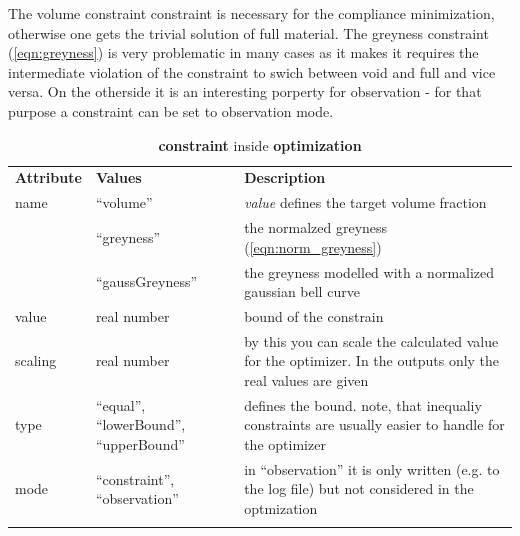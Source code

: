 The volume constraint constraint is necessary for the compliance minimization, otherwise
one gets the trivial solution of full material. The greyness constraint (\ref{eqn:greyness}) is very problematic in many cases as it makes it requires the intermediate violation of the constraint to swich between void and full and vice versa.
On the otherside it is an interesting porperty for observation - for that purpose
a constraint can be set to observation mode.   

\begin{center}
\begin{longtable}{lp{}p{}}
\hline\noalign{\smallskip}
\textbf{Attribute} & \textbf{Values} & \textbf{Description} \\
\noalign{\smallskip}\hline\noalign{\smallskip}
name     & ``volume''  & \textsl{value} defines the target volume fraction \\
         & ``greyness'' & the normalzed greyness (\ref{eqn:norm_greyness}) \\
         & ``gaussGreyness'' & the greyness modelled with a normalized gaussian bell curve \\
value    & real number & bound of the constrain \\
scaling  & real number & by this you can scale the calculated value for the optimizer. In
the outputs only the real values are given \\         
type     & ``equal'', ``lowerBound'', ``upperBound'' & defines the bound. note, that inequaliy constraints are usually easier to handle for the optimizer \\
mode & ``constraint'', ``observation'' & in ``observation'' it is only written (e.g. to the log file) but not considered in the optmization \\
\noalign{\smallskip}\hline\noalign{\smallskip}
\caption{\textbf{constraint} inside \textbf{optimization}}
\end{longtable}
\end{center} 


\label{sec:gen_optimization}